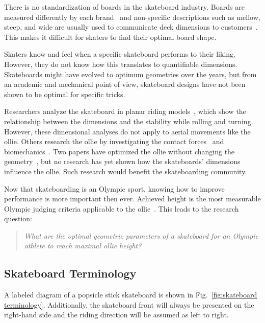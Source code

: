 \documentclass[default,iicol]{sn-jnl}
\begin{document}
There is no standardization of boards in the skateboard industry.
Boards are measured differently by each brand~\cite{johnny_skateboarding_2013} and non-specific descriptions such as mellow, steep, and wide are usually used to communicate deck dimensions to customers~\cite{berger_handmade_2021}.
This makes it difficult for skaters to find their optimal board shape.

Skaters know and feel when a specific skateboard performs to their liking.
However, they do not know how this translates to quantifiable dimensions.
Skateboards might have evolved to optimum geometries over the years, but from an academic and mechanical point of view, skateboard designs have not been shown to be optimal for specific tricks.

Researchers analyze the skateboard in planar riding models~\cite{hubbard_lateral_1979,hubbard_human_1980,kremnev_nonlinear_2010,ispolov_skateboard_1996,rosatello_skateboard_2015,varszegi_stability_2017,varszegi_stabilizing_2016,varszegi_downhill_2016,varszegi_balancing_2014,kuleshov_mathematical_2007,kuleshov_various_2010}, which show the relationship between the dimensions and the stability while rolling and turning. 
However, these dimensional analyses do not apply to aerial movements like the ollie.
Others research the ollie by investigating the contact forces~\cite{anderson_ollie_2020,shield_contact-implicit_2022} and biomechanics~\cite{frederick_biomechanics_2006,vorlicek_analysis_2015,wood_3d_2020,nakashima_simulation_2021,nevitt_ground_2006,candotti_lower_2012,dias_using_2016,anderson_ollie_2020,bridgman_human_1992,ou_postural_2021}.
Two papers have optimized the ollie without changing the geometry~\cite{anderson_ollie_2020,shield_contact-implicit_2022}, but no research has yet shown how the skateboards' dimensions influence the ollie.
Such research would benefit the skateboarding community.

Now that skateboarding is an Olympic sport, knowing how to improve performance is more important then ever.
Achieved height is the most measurable Olympic judging criteria applicable to the ollie~\cite{world_skate_skateboarding_2021}.
This leads to the research question:
\begin{quote}
\textit{
    What are the optimal geometric parameters of a skateboard for an Olympic athlete to reach maximal ollie height?}
\end{quote}

\subsection{Skateboard Terminology}
A labeled diagram of a popsicle stick skateboard is shown in Fig.~\ref{fig:skateboard terminology}. 
Additionally, the skateboard front will always be presented on the right-hand side and the riding direction will be assumed as left to right.
\end{document}
